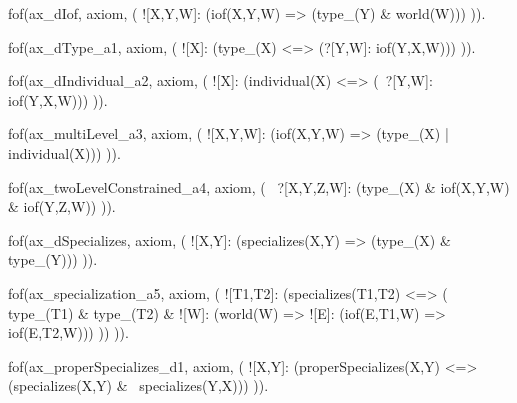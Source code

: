 
fof(ax_dIof, axiom, (
  ![X,Y,W]: (iof(X,Y,W) => (type_(Y) & world(W)))
)).

fof(ax_dType_a1, axiom, (
  ![X]: (type_(X) <=> (?[Y,W]: iof(Y,X,W)))
)).

fof(ax_dIndividual_a2, axiom, (
  ![X]: (individual(X) <=> (~?[Y,W]: iof(Y,X,W)))
)).

fof(ax_multiLevel_a3, axiom, (
  ![X,Y,W]: (iof(X,Y,W) => (type_(X) | individual(X)))
)).

fof(ax_twoLevelConstrained_a4, axiom, (
  ~?[X,Y,Z,W]: (type_(X) & iof(X,Y,W) & iof(Y,Z,W))
)).








fof(ax_dSpecializes, axiom, (
  ![X,Y]: (specializes(X,Y) => (type_(X) & type_(Y)))
)).

fof(ax_specialization_a5, axiom, (
  ![T1,T2]: (specializes(T1,T2) <=> (
    type_(T1) & type_(T2) & ![W]: (world(W) => ![E]: (iof(E,T1,W) => iof(E,T2,W)))
  ))
)).

fof(ax_properSpecializes_d1, axiom, (
  ![X,Y]: (properSpecializes(X,Y) <=> (specializes(X,Y) & ~specializes(Y,X)))
)).





